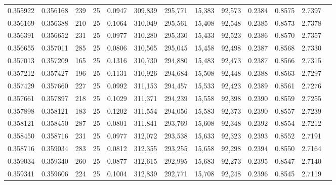 \begin{tabular}{rrrrrrrrrrrrr}
0.355922 & 0.356168 &   239 &  25 &                                     0.0947 & 309,839 & 295,771 &  15,383 &  92,573 & 0.2384 & 0.8575 & 2.7397 \\
0.356169 & 0.356388 &   210 &  25 &                                     0.1064 & 310,049 & 295,561 &  15,408 &  92,548 & 0.2385 & 0.8573 & 2.7378 \\
0.356391 & 0.356652 &   231 &  25 &                                     0.0977 & 310,280 & 295,330 &  15,433 &  92,523 & 0.2386 & 0.8570 & 2.7357 \\
0.356655 & 0.357011 &   285 &  25 &                                     0.0806 & 310,565 & 295,045 &  15,458 &  92,498 & 0.2387 & 0.8568 & 2.7330 \\
0.357013 & 0.357209 &   165 &  25 &                                     0.1316 & 310,730 & 294,880 &  15,483 &  92,473 & 0.2387 & 0.8566 & 2.7315 \\
0.357212 & 0.357427 &   196 &  25 &                                     0.1131 & 310,926 & 294,684 &  15,508 &  92,448 & 0.2388 & 0.8563 & 2.7297 \\
0.357429 & 0.357660 &   227 &  25 &                                     0.0992 & 311,153 & 294,457 &  15,533 &  92,423 & 0.2389 & 0.8561 & 2.7276 \\
0.357661 & 0.357897 &   218 &  25 &                                     0.1029 & 311,371 & 294,239 &  15,558 &  92,398 & 0.2390 & 0.8559 & 2.7255 \\
0.357898 & 0.358121 &   183 &  25 &                                     0.1202 & 311,554 & 294,056 &  15,583 &  92,373 & 0.2390 & 0.8557 & 2.7239 \\
0.358121 & 0.358450 &   287 &  25 &                                     0.0801 & 311,841 & 293,769 &  15,608 &  92,348 & 0.2392 & 0.8554 & 2.7212 \\
0.358450 & 0.358716 &   231 &  25 &                                     0.0977 & 312,072 & 293,538 &  15,633 &  92,323 & 0.2393 & 0.8552 & 2.7191 \\
0.358716 & 0.359034 &   283 &  25 &                                     0.0812 & 312,355 & 293,255 &  15,658 &  92,298 & 0.2394 & 0.8550 & 2.7164 \\
0.359034 & 0.359340 &   260 &  25 &                                     0.0877 & 312,615 & 292,995 &  15,683 &  92,273 & 0.2395 & 0.8547 & 2.7140 \\
0.359341 & 0.359606 &   224 &  25 &                                     0.1004 & 312,839 & 292,771 &  15,708 &  92,248 & 0.2396 & 0.8545 & 2.7119 \\

\end{tabular}
